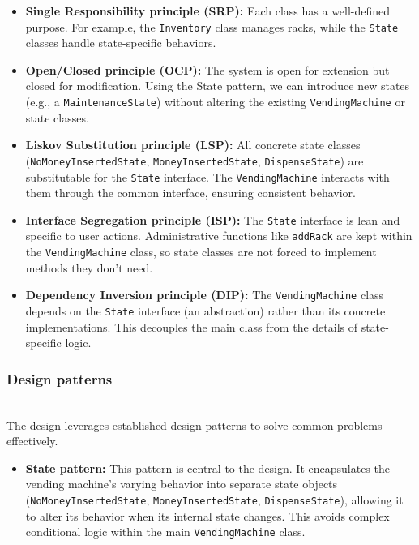 \begin{itemize}
\item
\protect{}\label{ModuoE4y644M5n3eXRF4m}
\textbf{Single Responsibility principle (SRP):} Each class has a well-defined purpose. For example, the \texttt{Inventory} class manages racks, while the \texttt{State} classes handle state-specific behaviors.
\item
\protect{}\label{Myb_h5ClAJU55sAlgn6w5}
\textbf{Open/Closed principle (OCP):} The system is open for extension but closed for modification. Using the State pattern, we can introduce new states (e.g., a \texttt{MaintenanceState}) without altering the existing \texttt{VendingMachine} or state classes.
\item
\protect{}\label{o4yYxMdfPd9Xf82DtvX-A}
\textbf{Liskov Substitution principle (LSP):} All concrete state classes (\texttt{NoMoneyInsertedState}, \texttt{MoneyInsertedState}, \texttt{DispenseState}) are substitutable for the \texttt{State} interface. The \texttt{VendingMachine} interacts with them through the common interface, ensuring consistent behavior.
\item
\protect{}\label{XZAU3OeV6CpKQ8VWYKKZk}
\textbf{Interface Segregation principle (ISP):} The \texttt{State} interface is lean and specific to user actions. Administrative functions like \texttt{addRack} are kept within the \texttt{VendingMachine} class, so state classes are not forced to implement methods they don't need.
\item
\protect{}\label{fMdBrcJ-4BHFBhPkkl6Qn}
\textbf{Dependency Inversion principle (DIP):} The \texttt{VendingMachine} class depends on the \texttt{State} interface (an abstraction) rather than its concrete implementations. This decouples the main class from the details of state-specific logic.
\end{itemize}

\subsubsection{Design patterns}\label{GlqRsR5Gb4uRmWqxe71rO}
\\
The design leverages established design patterns to solve common problems effectively.

\begin{itemize}
\item
\protect{}\label{rdYrMl-173UglOP7ZxA4e}
\textbf{State pattern:} This pattern is central to the design. It encapsulates the vending machine's varying behavior into separate state objects (\texttt{NoMoneyInsertedState}, \texttt{MoneyInsertedState}, \texttt{DispenseState}), allowing it to alter its behavior when its internal state changes. This avoids complex conditional logic within the main \texttt{VendingMachine} class.
\end{itemize}

